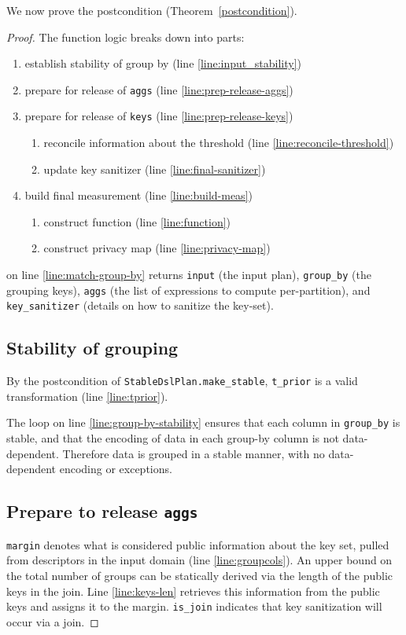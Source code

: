 \documentclass{article}
\begin{document}
We now prove the postcondition (Theorem~\ref{postcondition}).
\begin{proof}

The function logic breaks down into parts:
\begin{enumerate}
    \item establish stability of group by (line \ref{line:input_stability})
    \item prepare for release of \texttt{aggs} (line \ref{line:prep-release-aggs})
    \item prepare for release of \texttt{keys} (line \ref{line:prep-release-keys})
    \begin{enumerate}
        \item reconcile information about the threshold (line \ref{line:reconcile-threshold})
        \item update key sanitizer (line \ref{line:final-sanitizer})
    \end{enumerate}
    \item build final measurement (line \ref{line:build-meas})
    \begin{enumerate}
        \item construct function (line \ref{line:function})
        \item construct privacy map (line \ref{line:privacy-map})
    \end{enumerate}
\end{enumerate}

 on line \ref{line:match-group-by} returns 
\texttt{input} (the input plan), \texttt{group\_by} (the grouping keys), \texttt{aggs} (the list of expressions to compute per-partition),
and \texttt{key\_sanitizer} (details on how to sanitize the key-set).

\subsection{Stability of grouping}
By the postcondition of \texttt{StableDslPlan.make\_stable}, \texttt{t\_prior} is a valid transformation (line \ref{line:tprior}).

The loop on line \ref{line:group-by-stability} ensures that each column in \texttt{group\_by} is stable,
and that the encoding of data in each group-by column is not data-dependent.
Therefore data is grouped in a stable manner, with no data-dependent encoding or exceptions.

\subsection{Prepare to release \texttt{aggs}}
\texttt{margin} denotes what is considered public information about the key set, 
pulled from descriptors in the input domain (line \ref{line:groupcols}).
An upper bound on the total number of groups can be statically derived via the length of the public keys in the join.
Line \ref{line:keys-len} retrieves this information from the public keys and assigns it to the margin.
\texttt{is\_join} indicates that key sanitization will occur via a join.


\end{proof}
\end{document}
